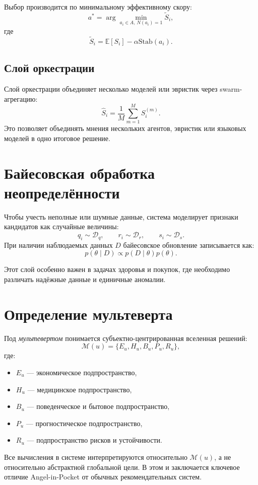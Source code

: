 \documentclass[11pt,a4paper]{article}
\begin{document}
Выбор производится по минимальному эффективному скору:
\[
a^* = \arg\min_{a_i \in A,\, N(a_i)=1} \tilde{S}_i,
\]
где
\[
\tilde{S}_i = \mathbb{E}[S_i] - \alpha \mathrm{Stab}(a_i).
\]

\subsection{Слой оркестрации}
Слой оркестрации объединяет несколько моделей или эвристик через swarm-агрегацию:
\[
\hat{S}_i = \frac{1}{M} \sum_{m=1}^{M} S_i^{(m)}.
\]
Это позволяет объединять мнения нескольких агентов, эвристик или языковых моделей в одно итоговое решение.

\section{Байесовская обработка неопределённости}

Чтобы учесть неполные или шумные данные, система моделирует признаки кандидатов как случайные величины:
\[
q_i \sim \mathcal{D}_q, \qquad r_i \sim \mathcal{D}_r, \qquad s_i \sim \mathcal{D}_s.
\]
При наличии наблюдаемых данных $D$ байесовское обновление записывается как:
\[
p(\theta \mid D) \propto p(D \mid \theta)p(\theta).
\]

Этот слой особенно важен в задачах здоровья и покупок, где необходимо различать надёжные данные и единичные аномалии.

\section{Определение мультеверта}

Под \emph{мультевертом} понимается субъектно-центрированная вселенная решений:
\[
\mathcal{M}(u) = \{E_u, H_u, B_u, P_u, R_u\},
\]
где:
\begin{itemize}[leftmargin=1.2em]
    \item $E_u$ — экономическое подпространство,
    \item $H_u$ — медицинское подпространство,
    \item $B_u$ — поведенческое и бытовое подпространство,
    \item $P_u$ — прогностическое подпространство,
    \item $R_u$ — подпространство рисков и устойчивости.
\end{itemize}

Все вычисления в системе интерпретируются относительно $\mathcal{M}(u)$, а не относительно абстрактной глобальной цели. В этом и заключается ключевое отличие Angel-in-Pocket от обычных рекомендательных систем.
\end{document}
